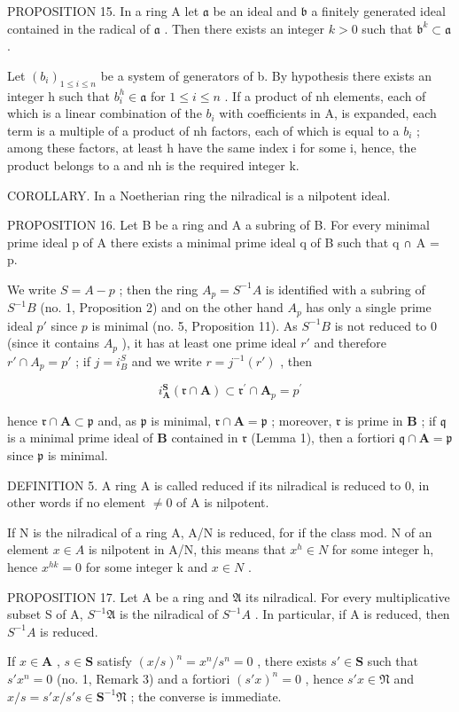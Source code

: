 PROPOSITION 15. In a ring A let \(\mathfrak{a}\) be an ideal and \(\mathfrak{b}\) a finitely generated ideal contained in the radical of \(\mathfrak{a}\) . Then there exists an integer \(k > 0\) such that \(\mathfrak{b}^k \subset \mathfrak{a}\) .

Let \((b_{i})_{1\leqslant i\leqslant n}\) be a system of generators of b. By hypothesis there exists an integer h such that \(b_{i}^{h}\in\mathfrak{a}\) for \(1\leqslant i\leqslant n\) . If a product of nh elements, each of which is a linear combination of the \(b_{i}\) with coefficients in A, is expanded, each term is a multiple of a product of nh factors, each of which is equal to a \(b_{i}\) ; among these factors, at least h have the same index i for some i, hence, the product belongs to a and nh is the required integer k.

COROLLARY. In a Noetherian ring the nilradical is a nilpotent ideal.

PROPOSITION 16. Let B be a ring and A a subring of B. For every minimal prime ideal p of A there exists a minimal prime ideal q of B such that q ∩ A = p.

We write \(S = A - p\) ; then the ring \(A_p = S^{-1}A\) is identified with a subring of \(S^{-1}B\) (no. 1, Proposition 2) and on the other hand \(A_p\) has only a single prime ideal \(p'\) since \(p\) is minimal (no. 5, Proposition 11). As \(S^{-1}B\) is not reduced to 0 (since it contains \(A_p\) ), it has at least one prime ideal \(r'\) and therefore \(r' \cap A_p = p'\) ; if \(j = i_B^S\) and we write \(r = j^{-1}(r')\) , then

\[
i _ {\mathbf {A}} ^ {\mathbf {S}} (\mathfrak {r} \cap \mathbf {A}) \subset \mathfrak {r} ^ {\prime} \cap \mathbf {A} _ {p} = p ^ {\prime}
\]

hence \(\mathfrak{r} \cap \mathbf{A} \subset \mathfrak{p}\) and, as \(\mathfrak{p}\) is minimal, \(\mathfrak{r} \cap \mathbf{A} = \mathfrak{p}\) ; moreover, \(\mathfrak{r}\) is prime in \(\mathbf{B}\) ; if \(\mathfrak{q}\) is a minimal prime ideal of \(\mathbf{B}\) contained in \(\mathfrak{r}\) (Lemma 1), then a fortiori \(\mathfrak{q} \cap \mathbf{A} = \mathfrak{p}\) since \(\mathfrak{p}\) is minimal.

DEFINITION 5. A ring A is called reduced if its nilradical is reduced to 0, in other words if no element \(\neq 0\) of A is nilpotent.

If N is the nilradical of a ring A, A/N is reduced, for if the class mod. N of an element \(x \in A\) is nilpotent in A/N, this means that \(x^{h} \in N\) for some integer h, hence \(x^{hk} = 0\) for some integer k and \(x \in N\) .

PROPOSITION 17. Let A be a ring and \(\mathfrak{A}\) its nilradical. For every multiplicative subset S of A, \(S^{-1}\mathfrak{A}\) is the nilradical of \(S^{-1}A\) . In particular, if A is reduced, then \(S^{-1}A\) is reduced.

If \(x \in \mathbf{A}\) , \(s \in \mathbf{S}\) satisfy \((x / s)^n = x^n / s^n = 0\) , there exists \(s' \in \mathbf{S}\) such that \(s' x^n = 0\) (no. 1, Remark 3) and a fortiori \((s' x)^n = 0\) , hence \(s' x \in \mathfrak{N}\) and \(x / s = s' x / s' s \in \mathbf{S}^{-1} \mathfrak{N}\) ; the converse is immediate.

